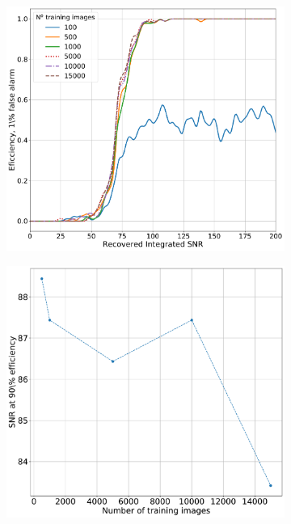 \begin{figure}[h]
	\begin{subfigure}[h]{0.5\textwidth}
		\includegraphics[width=\linewidth]{C4_cnn/gauss_sens_with_trainnum_eff.pdf}
		\caption{}
		\label{machine:results:sens_size:gauss_sens:eff}
	\end{subfigure}
	\begin{subfigure}[h]{0.5\textwidth}
		\includegraphics[width=\linewidth]{C4_cnn/gauss_sens_with_trainnum.pdf}

\end{subfigure}
\end{figure}
